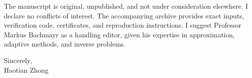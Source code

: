 \documentclass[11pt,letterpaper]{article}
\begin{document}
The manuscript is original, unpublished, and not under consideration elsewhere. I declare no conflicts of interest. The accompanying archive provides exact inputs, verification code, certificates, and reproduction instructions. I suggest Professor Markus Bachmayr as a handling editor, given his expertise in approximation, adaptive methods, and inverse problems.

Sincerely,\\[0.35em]
Haotian Zhong
\end{document}
